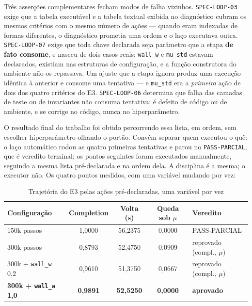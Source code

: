 Três asserções complementares fecham modos de falha vizinhos.
\texttt{SPEC-LOOP-03} exige que a tabela executável e a tabela textual exibida no
diagnóstico cubram os mesmos critérios com o mesmo número de ações --- quando
eram indexadas de formas diferentes, o diagnóstico prometia uma ordem e o laço
executava outra. \texttt{SPEC-LOOP-07} exige que toda chave declarada seja
parâmetro que a etapa \textbf{de fato consome}, e nasceu de dois casos reais:
\texttt{wall\_w} e \texttt{mu\_std} estavam declarados, existiam nas estruturas
de configuração, e a função construtora do ambiente não os repassava. Um ajuste
que a etapa ignora produz uma execução idêntica à anterior e consome uma
tentativa --- e \texttt{mu\_std} era a \textit{primeira} ação de dois dos quatro
critérios do E3. \texttt{SPEC-LOOP-06} determina que falha das camadas de teste
ou de invariantes não consuma tentativa: é defeito de código ou de ambiente, e se
corrige no código, nunca no hiperparâmetro.

O resultado final do trabalho foi obtido percorrendo essa lista, em ordem, sem
escolher hiperparâmetro olhando o portão. Convém separar quem executou o quê: o
laço automático rodou as quatro primeiras tentativas e parou no
\texttt{PASS-PARCIAL}, que é veredito terminal; os pontos seguintes foram
executados manualmente, seguindo a mesma lista pré-declarada e na ordem dela. A
disciplina é a mesma; o executor não. Os quatro pontos medidos, com uma variável
mudando por vez:

\begin{table}[h]
    \centering
    \begin{tabular}{|p{3.2cm}|c|c|c|p{3.2cm}|}
        \hline
        \textbf{Configuração} & \textbf{Completion} & \textbf{Volta (s)} &
        \textbf{Queda sob $\mu$} & \textbf{Veredito} \\
        \hline
        150k passos                    & 1,0000 & 56,2375 & 0,0000 & PASS-PARCIAL \\
        \hline
        300k passos                    & 0,8793 & 52,4750 & 0,0909 & reprovado (compl., $\mu$) \\
        \hline
        300k + \texttt{wall\_w} 0,2    & 0,9610 & 51,3750 & 0,0667 & reprovado (compl., $\mu$) \\
        \hline
        \textbf{300k + \texttt{wall\_w} 1,0} & \textbf{0,9891} & \textbf{52,5250} &
        \textbf{0,0000} & \textbf{aprovado} \\
        \hline
    \end{tabular}
    \caption{Trajetória do E3 pelas ações pré-declaradas, uma variável por vez}
    \label{tab:val_acoes_e3}
\end{table}

